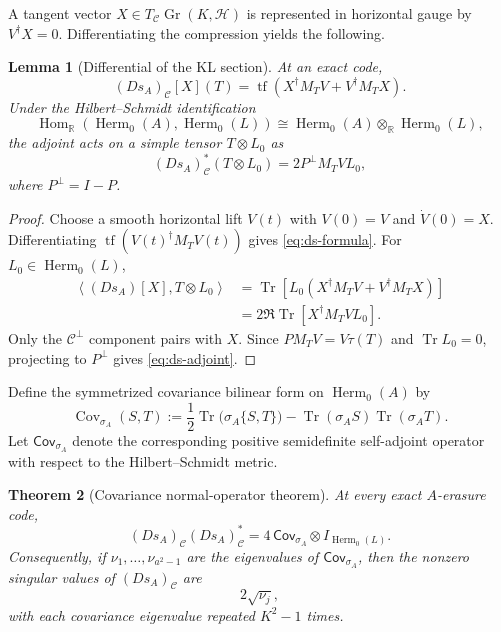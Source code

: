 \documentclass[11pt]{article}
\newtheorem{theorem}{Theorem}[section]
\newtheorem{lemma}[theorem]{Lemma}
\theoremstyle{definition}
\newcommand{\cH}{\mathcal H}
\newcommand{\cC}{\mathcal C}
\newcommand{\Gr}{\operatorname{Gr}}
\newcommand{\Herm}{\operatorname{Herm}}
\newcommand{\Tr}{\operatorname{Tr}}
\newcommand{\tf}{\operatorname{tf}}
\newcommand{\Cov}{\operatorname{Cov}}
\newcommand{\R}{\mathbb R}
\newcommand{\1}{\mathbf 1}
\newcommand{\inner}[2]{\left\langle #1,#2\right\rangle}
\begin{document}
A tangent vector $X\in T_{\cC}\Gr(K,\cH)$ is represented in horizontal gauge by $V^\dagger X=0$.  Differentiating the compression yields the following.

\begin{lemma}[Differential of the KL section]
\label{lem:ds}
At an exact code,
\begin{equation}
(Ds_A)_{\cC}[X](T)
=
\tf\!\left(X^\dagger M_TV+V^\dagger M_TX\right).
\label{eq:ds-formula}
\end{equation}
Under the Hilbert--Schmidt identification
\[
\operatorname{Hom}_{\R}(\Herm_0(A),\Herm_0(L))
\cong \Herm_0(A)\otimes_{\R}\Herm_0(L),
\]
the adjoint acts on a simple tensor $T\otimes L_0$ as
\begin{equation}
(Ds_A)_{\cC}^{*}(T\otimes L_0)
=2P^\perp M_T V L_0,
\label{eq:ds-adjoint}
\end{equation}
where $P^\perp=I-P$.
\end{lemma}

\begin{proof}
Choose a smooth horizontal lift $V(t)$ with $V(0)=V$ and $\dot V(0)=X$.  Differentiating $\tf(V(t)^\dagger M_TV(t))$ gives \eqref{eq:ds-formula}.  For $L_0\in\Herm_0(L)$,
\begin{align*}
\inner{(Ds_A)[X]}{T\otimes L_0}
&=\Tr\left[L_0\left(X^\dagger M_TV+V^\dagger M_TX\right)\right]\\
&=2\Re\Tr\left[X^\dagger M_TVL_0\right].
\end{align*}
Only the $\cC^\perp$ component pairs with $X$.  Since $P M_T V=V\tau(T)$ and $\Tr L_0=0$, projecting to $P^\perp$ gives \eqref{eq:ds-adjoint}.
\end{proof}

Define the symmetrized covariance bilinear form on $\Herm_0(A)$ by
\begin{equation}
\Cov_{\sigma_A}(S,T)
:=
\frac12\Tr\bigl(\sigma_A\{S,T\}\bigr)
-\Tr(\sigma_A S)\Tr(\sigma_A T).
\label{eq:covariance}
\end{equation}
Let $\mathsf{Cov}_{\sigma_A}$ denote the corresponding positive semidefinite self-adjoint operator with respect to the Hilbert--Schmidt metric.

\begin{theorem}[Covariance normal-operator theorem]
\label{thm:covariance}
At every exact $A$-erasure code,
\begin{equation}
\boxed{
(Ds_A)_{\cC}(Ds_A)_{\cC}^{*}
=
4\,\mathsf{Cov}_{\sigma_A}
\otimes I_{\Herm_0(L)}.
}
\label{eq:covariance-normal}
\end{equation}
Consequently, if $\nu_1,\ldots,\nu_{a^2-1}$ are the eigenvalues of $\mathsf{Cov}_{\sigma_A}$, then the nonzero singular values of $(Ds_A)_{\cC}$ are
\begin{equation}
2\sqrt{\nu_j},
\label{eq:singular-general}
\end{equation}
with each covariance eigenvalue repeated $K^2-1$ times.
\end{theorem}
\end{document}
